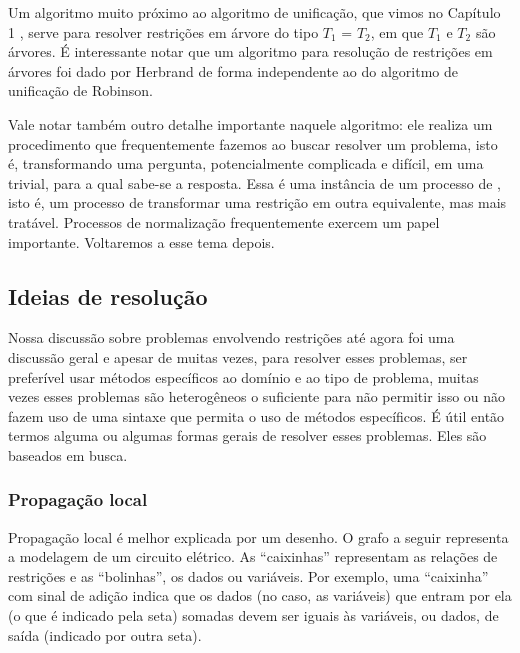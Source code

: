 \documentclass{article}
\begin{document}
Um algoritmo muito próximo ao algoritmo de unificação, que vimos no
Capítulo 1 %
, serve para resolver restrições em
árvore do tipo $T_1$ = $T_2$, em que $T_1$ e $T_2$ são árvores. É
interessante notar que um algoritmo para resolução de restrições em
árvores foi dado por Herbrand\cite{herbrand} de forma independente ao
do algoritmo de unificação de Robinson.

Vale notar também outro detalhe importante naquele algoritmo: ele
realiza um procedimento que frequentemente fazemos ao buscar resolver
um problema, isto é, transformando uma pergunta, potencialmente
complicada e difícil, em uma trivial, para a qual sabe-se a
resposta. Essa é uma instância de um processo de
, isto é, um processo de transformar uma
restrição em outra equivalente, mas mais tratável. Processos de
normalização frequentemente exercem um papel importante. Voltaremos a
esse tema depois.

\subsection{Ideias de resolução}

Nossa discussão sobre problemas envolvendo restrições até agora foi
uma discussão geral e apesar de muitas vezes, para resolver esses
problemas, ser preferível usar métodos específicos ao domínio e ao
tipo de problema, muitas vezes esses problemas são heterogêneos o
suficiente para não permitir isso ou não fazem uso de uma sintaxe que
permita o uso de métodos específicos.  É útil então termos alguma ou
algumas formas gerais de resolver esses problemas. Eles são baseados
em busca.

\subsubsection{Propagação local}

Propagação local é melhor explicada por um desenho. O grafo a seguir
representa a modelagem de um circuito elétrico.  As ``caixinhas''
representam as relações de restrições e as ``bolinhas'', os dados ou
variáveis. Por exemplo, uma ``caixinha'' com sinal de adição indica
que os dados (no caso, as variáveis) que entram por ela (o que é
indicado pela seta) somadas devem ser iguais às variáveis, ou dados,
de saída (indicado por outra seta).
\end{document}
